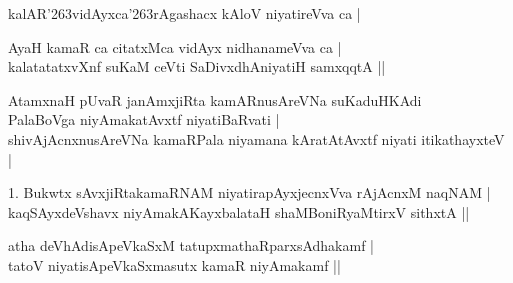 \begin{entry}
\begin{shl}
kalAR{\char'263}vidAyxca{\char'263}rAgashacx kAloV niyatireVva ca |
\end{shl}
\begin{shl}
AyaH kamaR ca citatxMca vidAyx nidhanameVva ca |\\
kalatatatxvXnf suKaM ceVti SaDivxdhAniyatiH samxqqtA ||
\end{shl}
\gl{}
\info{}{}{}{}
\begin{shl}
AtamxnaH pUvaR janAmxjiRta kamARnusAreVNa suKaduHKAdi\\
PalaBoVga niyAmakatAvxtf niyatiBaRvati |\\
shivAjAcnxnusAreVNa kamaRPala niyamana kAratAtAvxtf niyati itikathayxteV |
\end{shl}
\begin{shl}
1. Bukwtx sAvxjiRtakamaRNAM niyatirapAyxjecnxVva rAjAcnxM naqNAM |\\
kaqSAyxdeVshavx niyAmakAKayxbalataH shaMBoniRyaMtirxV sithxtA ||
\end{shl}
\begin{shl}
atha deVhAdisApeVkaSxM tatupxmathaRparxsAdhakamf |\\
tatoV niyatisApeVkaSxmasutx kamaR niyAmakamf ||
\end{shl}

\end{entry}

